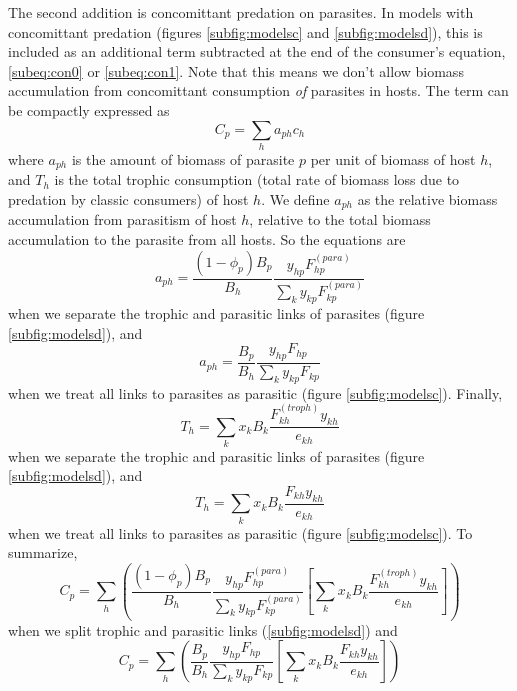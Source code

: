 \documentclass[11pt]{amsart}
\begin{document}
The second addition is concomittant predation on parasites.  In models with concomittant predation (figures \ref{subfig:modelsc} and \ref{subfig:modelsd}), this is included as an additional term subtracted at the end of the consumer's equation, \eqref{subeq:con0} or \eqref{subeq:con1}.  Note that this means we don't allow biomass accumulation from concomittant consumption \textit{of} parasites in hosts.  The term can be compactly expressed as 
\begin{equation}
C_p = \sum_ha_{ph}c_h \label{cp1}
\end{equation}
where $a_{ph}$ is the amount of biomass of parasite $p$ per unit of biomass of host $h$, and $T_h$ is the total trophic consumption (total rate of biomass loss due to predation by classic consumers) of host $h$.  We define $a_{ph}$ as the relative biomass accumulation from parasitism of host $h$, relative to the total biomass accumulation to the parasite from all hosts.  So the equations are 
\begin{equation}
a_{ph} = \frac{(1-\phi_p)B_p}{B_h}\frac{y_{hp}F^{(para)}_{hp}}{\sum_{k}y_{kp}F^{(para)}_{kp}} \label{eq:aph1}
\end{equation}
when we separate the trophic and parasitic links of parasites (figure \ref{subfig:modelsd}), and
\begin{equation}
a_{ph} = \frac{B_p}{B_h}\frac{y_{hp}F_{hp}}{\sum_{k}y_{kp}F_{kp}} \label{eq:aph0}
\end{equation}
when we treat all links to parasites as parasitic (figure \ref{subfig:modelsc}).  Finally,
\begin{equation}
T_h = \sum_kx_kB_k\frac{F^{(troph)}_{kh}y_{kh}}{e_{kh}} \label{eq:Th1}
\end{equation}
when we separate the trophic and parasitic links of parasites (figure \ref{subfig:modelsd}), and
\begin{equation}
T_h = \sum_kx_kB_k\frac{F_{kh}y_{kh}}{e_{kh}} \label{eq:Th0}
\end{equation}
when we treat all links to parasites as parasitic (figure \ref{subfig:modelsc}).  To summarize,
\begin{equation}
C_p = \sum_h \left(\frac{(1-\phi_p)B_p}{B_h}\frac{y_{hp}F^{(para)}_{hp}}{\sum_{k}y_{kp}F^{(para)}_{kp}}\left[\sum_kx_kB_k\frac{F^{(troph)}_{kh}y_{kh}}{e_{kh}}\right] \right) \label{eq:cp2}
\end{equation}
when we split trophic and parasitic links (\ref{subfig:modelsd}) and
\begin{equation}
C_p = \sum_h \left(\frac{B_p}{B_h}\frac{y_{hp}F_{hp}}{\sum_{k}y_{kp}F_{kp}}\left[\sum_kx_kB_k\frac{F_{kh}y_{kh}}{e_{kh}}\right] \right) \label{cp2}
\end{equation}
\end{document}
